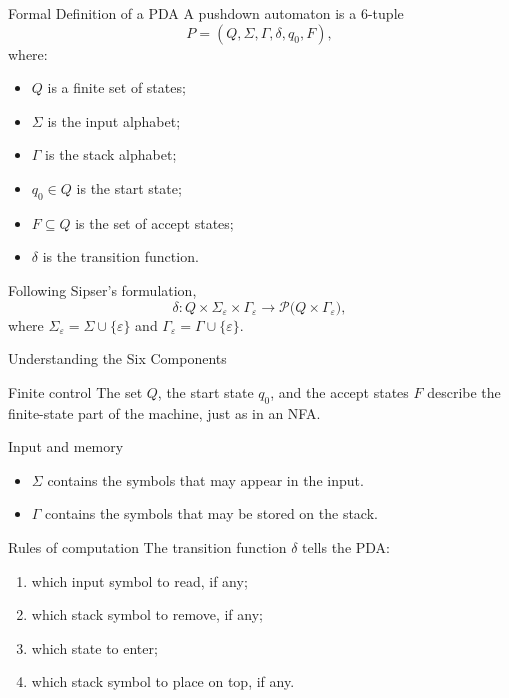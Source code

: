 \documentclass[aspectratio=169,10pt]{beamer}
\newcommand{\eps}{\varepsilon}
\newcommand{\Pow}{\mathcal{P}}
\begin{document}
\begin{frame}{Formal Definition of a PDA}
A pushdown automaton is a $6$-tuple
\[
P=(Q,\Sigma,\Gamma,\delta,q_0,F),
\]
where:

\begin{itemize}
    \item $Q$ is a finite set of states;
    \item $\Sigma$ is the input alphabet;
    \item $\Gamma$ is the stack alphabet;
    \item $q_0\in Q$ is the start state;
    \item $F\subseteq Q$ is the set of accept states;
    \item $\delta$ is the transition function.
\end{itemize}

\vspace{0.4em}
Following Sipser’s formulation,
\[
\delta:Q\times\Sigma_{\eps}\times\Gamma_{\eps}
\longrightarrow
\Pow\bigl(Q\times\Gamma_{\eps}\bigr),
\]
where $\Sigma_{\eps}=\Sigma\cup\{\eps\}$ and $\Gamma_{\eps}=\Gamma\cup\{\eps\}$.
\end{frame}

\begin{frame}{Understanding the Six Components}

\begin{block}{Finite control}
The set \(Q\), the start state \(q_0\), and the accept states \(F\)
describe the finite-state part of the machine, just as in an NFA.
\end{block}

\begin{block}{Input and memory}
\begin{itemize}
    \item \(\Sigma\) contains the symbols that may appear in the input.
    \item \(\Gamma\) contains the symbols that may be stored on the stack.
\end{itemize}
\end{block}

\begin{block}{Rules of computation}
The transition function \(\delta\) tells the PDA:
\begin{enumerate}
    \item which input symbol to read, if any;
    \item which stack symbol to remove, if any;
    \item which state to enter;
    \item which stack symbol to place on top, if any.
\end{enumerate}
\end{block}

\end{frame}
\end{document}
